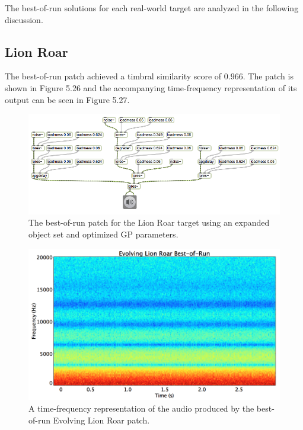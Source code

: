 \documentclass[12pt]{report} 	%
\numberwithin{figure}{chapter}
\numberwithin{table}{chapter}
\numberwithin{equation}{chapter}
\begin{document}
\begin{flushleft}
The best-of-run solutions for each real-world target are analyzed in the following discussion.

\subsection{Lion Roar}

The best-of-run patch achieved a timbral similarity score of $0.966$. The patch is shown in Figure 5.26 and the accompanying time-frequency representation of its output can be seen in Figure 5.27.

\begin{figure}[h!]
\begin{center}
\includegraphics[angle = 270, scale = 0.60]{Lion_Best}
\caption[Lion roar best-of-run patch]{The best-of-run patch for the Lion Roar target using an expanded object set and optimized GP parameters.}
\end{center}
\end{figure}
\begin{figure}[h!]
\begin{center}
\includegraphics[scale=0.35,width=\linewidth]{EvolvingLionRoarBestOfRunSTFT}
\caption[Best-of-run evolving lion roar time-frequency representation]{A time-frequency representation of the audio produced by the best-of-run Evolving Lion Roar patch.}

\end{center}
\end{figure}
\end{flushleft}
\end{document}
